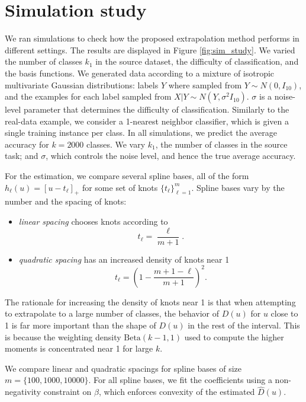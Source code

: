 \documentclass[twoside,11pt]{article}
\begin{document}
\section{Simulation study}\label{sec:simulation_study}

We ran simulations to check how the proposed extrapolation method performs in different settings.  The results are displayed in Figure \ref{fig:sim_study}. We varied the number of classes $k_1$ in the source dataset, the difficulty of classification, and the basis functions. We generated data according to a mixture of isotropic multivariate Gaussian distributions: labels $Y$ where sampled from $Y \sim N(0, I_{10})$, and the examples for each label sampled from $X|Y \sim N(Y, \sigma^2 I_{10})$. $\sigma$ is a noise-level parameter that determines the difficulty of classification. Similarly to the real-data example, we consider a 1-nearest neighbor classifier, which is given a single training instance per class. In all simulations, we predict the average accuracy for $k = 2000$ classes. We vary  $k_1$, the number of classes in the source task; and $\sigma$, which controls the noise level, and hence the true average accuracy.

For the estimation, we compare several spline bases, all of the form $h_\ell(u) = [u - t_\ell]_+$ for some set of knots $\{t_\ell\}_{\ell = 1}^m$. Spline bases vary by the number and the spacing of knots: 
\begin{itemize}
\item \emph{linear spacing} chooses knots according to
\[
t_\ell = \frac{\ell}{m+1}.
\]
\item \emph{quadratic spacing}  has an increased density of knots near 1
\[
t_\ell = \left(1 - \frac{m + 1 -\ell}{m+1}\right)^2.
\]
\end{itemize}

The rationale for increasing the density of knots near 1 is that
when attempting to extrapolate to a large number of
classes, the behavior of ${D}(u)$ for $u$ close to 1 is far more
important than the shape of ${D}(u)$ in the rest of the interval.
This is because the weighting density $\text{Beta}(k-1, 1)$ used to
compute the higher moments is concentrated near 1 for large $k$.


We compare linear and quadratic spacings for spline bases of size $m = \{100,1000,10000\}$.
For all spline bases, we fit the coefficients using a non-negativity constraint on $\beta$, 
which enforces convexity of the estimated $\hat{D}(u).$
\end{document}
